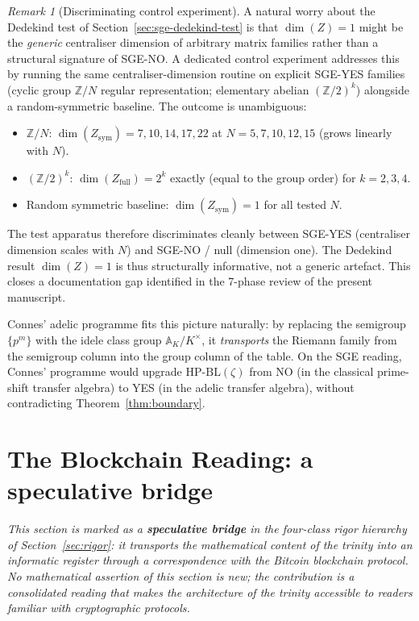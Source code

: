 \documentclass[11pt]{article}
\theoremstyle{definition}
\theoremstyle{remark}
\newtheorem{remark}[theorem]{Remark}
\newcommand{\HBL}{\mathrm{HP\text{-}BL}}
\begin{document}
\begin{remark}[Discriminating control experiment]
\label{rem:sge-control}
A natural worry about the Dedekind test of
Section~\ref{sec:sge-dedekind-test} is that $\dim(Z) = 1$ might be
the \emph{generic} centraliser dimension of arbitrary matrix
families rather than a structural signature of SGE-NO. A dedicated
control experiment \cite{SGEControlExperiment2026} addresses this
by running the same centraliser-dimension routine on explicit
SGE-YES families (cyclic group $\mathbb{Z}/N$ regular
representation; elementary abelian $(\mathbb{Z}/2)^k$) alongside
a random-symmetric baseline. The outcome is unambiguous:
\begin{itemize}
\item $\mathbb{Z}/N$: $\dim(Z_{\text{sym}}) = 7, 10, 14, 17, 22$
  at $N = 5, 7, 10, 12, 15$ (grows linearly with $N$).
\item $(\mathbb{Z}/2)^k$: $\dim(Z_{\text{full}}) = 2^k$ exactly
  (equal to the group order) for $k = 2, 3, 4$.
\item Random symmetric baseline: $\dim(Z_{\text{sym}}) = 1$ for
  all tested $N$.
\end{itemize}
The test apparatus therefore discriminates cleanly between SGE-YES
(centraliser dimension scales with $N$) and SGE-NO / null
(dimension one). The Dedekind result $\dim(Z) = 1$ is thus
structurally informative, not a generic artefact. This closes a
documentation gap identified in the 7-phase review
\cite{RHCritiqueReview2026} of the present manuscript.
\end{remark}

Connes' adelic programme \cite{Connes1999, Connes2026} fits this
picture naturally: by replacing the semigroup $\{p^m\}$ with the
idele class group $\mathbb{A}_K/K^\times$, it \emph{transports} the
Riemann family from the semigroup column into the group column of
the table. On the SGE reading, Connes' programme would upgrade
$\HBL(\zeta)$ from NO (in the classical prime-shift transfer
algebra) to YES (in the adelic transfer algebra), without
contradicting Theorem~\ref{thm:boundary}.

\section{The Blockchain Reading: a speculative bridge}
\label{sec:blockchain}

\emph{This section is marked as a \textbf{speculative bridge} in the
four-class rigor hierarchy of Section~\ref{sec:rigor}: it transports
the mathematical content of the trinity into an informatic register
through a correspondence with the Bitcoin blockchain protocol. No
mathematical assertion of this section is new; the contribution is a
consolidated reading that makes the architecture of the trinity
accessible to readers familiar with cryptographic protocols.}
\end{document}
